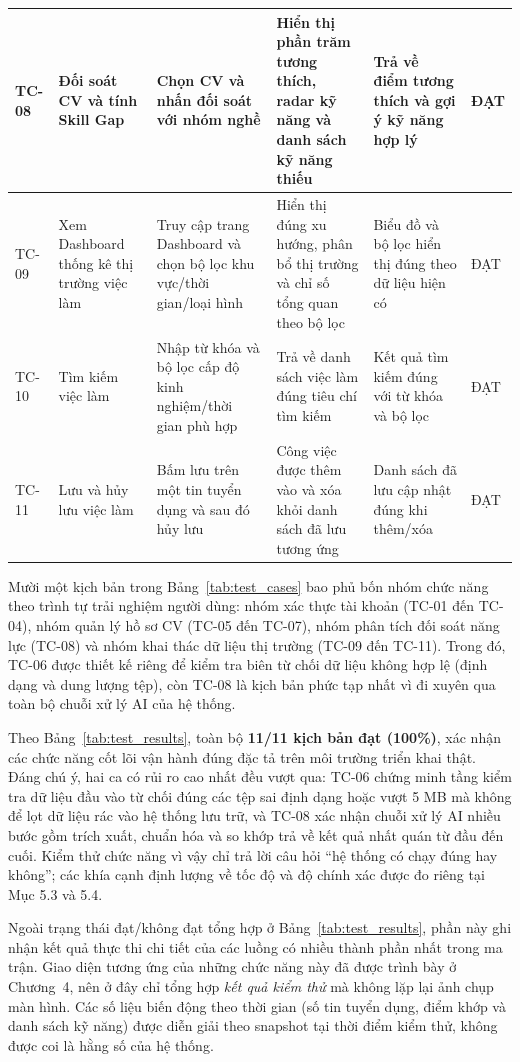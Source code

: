 {\begin{longtable}{|C{0.8cm}|L{2.6cm}|L{3.1cm}|L{3.2cm}|L{2.9cm}|C{1.0cm}|}
\hline
TC-08 & Đối soát CV và tính Skill Gap & Chọn CV và nhấn đối soát với nhóm nghề & Hiển thị phần trăm tương thích, radar kỹ năng và danh sách kỹ năng thiếu & Trả về điểm tương thích và gợi ý kỹ năng hợp lý & ĐẠT \\
\hline
TC-09 & Xem Dashboard thống kê thị trường việc làm & Truy cập trang Dashboard và chọn bộ lọc khu vực/thời gian/loại hình & Hiển thị đúng xu hướng, phân bổ thị trường và chỉ số tổng quan theo bộ lọc & Biểu đồ và bộ lọc hiển thị đúng theo dữ liệu hiện có & ĐẠT \\
\hline
TC-10 & Tìm kiếm việc làm & Nhập từ khóa và bộ lọc cấp độ kinh nghiệm/thời gian phù hợp & Trả về danh sách việc làm đúng tiêu chí tìm kiếm & Kết quả tìm kiếm đúng với từ khóa và bộ lọc & ĐẠT \\
\hline
TC-11 & Lưu và hủy lưu việc làm & Bấm lưu trên một tin tuyển dụng và sau đó hủy lưu & Công việc được thêm vào và xóa khỏi danh sách đã lưu tương ứng & Danh sách đã lưu cập nhật đúng khi thêm/xóa & ĐẠT \\
\hline
\end{longtable}
}
Mười một kịch bản trong Bảng~\ref{tab:test_cases} bao phủ bốn nhóm chức năng theo trình tự trải nghiệm người dùng: nhóm xác thực tài khoản (TC-01 đến TC-04), nhóm quản lý hồ sơ CV (TC-05 đến TC-07), nhóm phân tích đối soát năng lực (TC-08) và nhóm khai thác dữ liệu thị trường (TC-09 đến TC-11). Trong đó, TC-06 được thiết kế riêng để kiểm tra biên từ chối dữ liệu không hợp lệ (định dạng và dung lượng tệp), còn TC-08 là kịch bản phức tạp nhất vì đi xuyên qua toàn bộ chuỗi xử lý AI của hệ thống.

Theo Bảng~\ref{tab:test_results}, toàn bộ \textbf{11/11 kịch bản đạt (100\%)}, xác nhận các chức năng cốt lõi vận hành đúng đặc tả trên môi trường triển khai thật. Đáng chú ý, hai ca có rủi ro cao nhất đều vượt qua: TC-06 chứng minh tầng kiểm tra dữ liệu đầu vào từ chối đúng các tệp sai định dạng hoặc vượt 5 MB mà không để lọt dữ liệu rác vào hệ thống lưu trữ, và TC-08 xác nhận chuỗi xử lý AI nhiều bước gồm trích xuất, chuẩn hóa và so khớp trả về kết quả nhất quán từ đầu đến cuối. Kiểm thử chức năng vì vậy chỉ trả lời câu hỏi ``hệ thống có chạy đúng hay không''; các khía cạnh định lượng về tốc độ và độ chính xác được đo riêng tại Mục 5.3 và 5.4.

Ngoài trạng thái đạt/không đạt tổng hợp ở Bảng~\ref{tab:test_results}, phần này ghi nhận kết quả thực thi chi tiết của các luồng có nhiều thành phần nhất trong ma trận. Giao diện tương ứng của những chức năng này đã được trình bày ở Chương~4, nên ở đây chỉ tổng hợp \textit{kết quả kiểm thử} mà không lặp lại ảnh chụp màn hình. Các số liệu biến động theo thời gian (số tin tuyển dụng, điểm khớp và danh sách kỹ năng) được diễn giải theo snapshot tại thời điểm kiểm thử, không được coi là hằng số của hệ thống.

